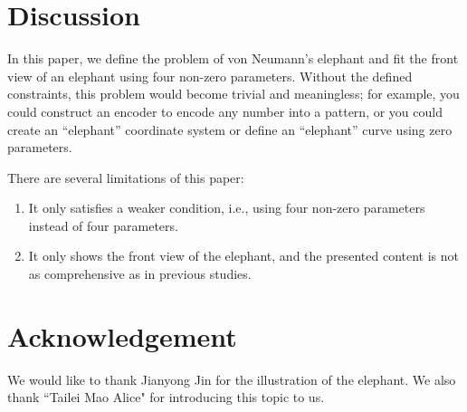\documentclass{article}
\begin{document}
\section{Discussion}
In this paper, we define the problem of von Neumann's elephant and fit the front view of an elephant using four non-zero parameters. Without the defined constraints, this problem would become trivial and meaningless; for example, you could construct an encoder to encode any number into a pattern, or you could create an ``elephant'' coordinate system or define an ``elephant'' curve using zero parameters. 

There are several limitations of this paper:

\begin{enumerate}
	\item It only satisfies a weaker condition, i.e., using four non-zero parameters instead of four parameters.
	\item It only shows the front view of the elephant, and the presented content is not as comprehensive as in previous studies.
\end{enumerate}

\section*{Acknowledgement}

We would like to thank Jianyong Jin for the illustration of the elephant. We also thank ``Tailei Mao Alice" for introducing this topic to us.




	
\end{document}
